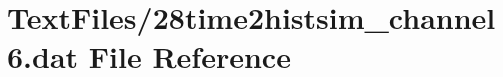 \hypertarget{28time2histsim__channel6_8dat}{}\section{Text\+Files/28time2histsim\+\_\+channel6.dat File Reference}
\label{28time2histsim__channel6_8dat}
